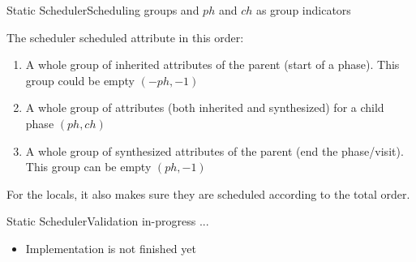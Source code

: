 \begin{frame}{Static Scheduler}{Scheduling groups and $ph$ and $ch$ as group indicators}

The scheduler scheduled attribute in this order:
\begin{enumerate}
    \item A whole group of inherited attributes of the parent (start of a phase). This group could be empty $(-ph, -1)$
    \item A whole group of attributes (both inherited and synthesized) for a child phase  $(ph, ch)$
    \item A whole group of synthesized attributes of the parent (end the phase/visit). This group can be empty $(ph, -1)$
\end{enumerate}


 For the locals, it also makes sure they are scheduled according to the total order.
 
\end{frame}


\begin{frame}{Static Scheduler}{Validation in-progress ...}

\begin{itemize}
    \item Implementation is \alert{not finished yet}
\end{itemize}

\end{frame}